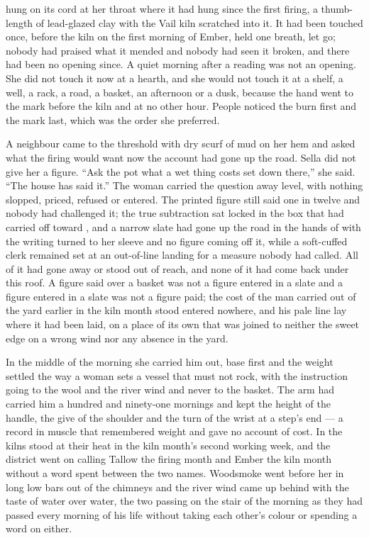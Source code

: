 hung on its cord at her throat where it had hung since the first firing, a thumb-length of lead-glazed clay with the Vail kiln scratched into it. It had been touched once, before the kiln on the first morning of Ember, held one breath, let go; nobody had praised what it mended and nobody had seen it broken, and there had been no opening since. A quiet morning after a reading was not an opening. She did not touch it now at a hearth, and she would not touch it at a shelf, a well, a rack, a road, a basket, an afternoon or a dusk, because the hand went to the mark before the kiln and at no other hour. People noticed the burn first and the mark last, which was the order she preferred.

A neighbour came to the threshold with dry scurf of mud on her hem and asked what the firing would want now the account had gone up the road. Sella did not give her a figure. “Ask the pot what a wet thing costs set down there,” she said. “The house has said it.” The woman carried the question away level, with nothing slopped, priced, refused or entered. The printed figure still said one in twelve and nobody had challenged it; the true subtraction sat locked in the box that  had carried off toward , and a narrow slate had gone up the road in the hands of  with the writing turned to her sleeve and no figure coming off it, while a soft-cuffed clerk remained set at an out-of-line landing for a measure nobody had called. All of it had gone away or stood out of reach, and none of it had come back under this roof. A figure said over a basket was not a figure entered in a slate and a figure entered in a slate was not a figure paid; the cost of the man carried out of the yard earlier in the kiln month stood entered nowhere, and his pale line lay where it had been laid, on a place of its own that was joined to neither the sweet edge on a wrong wind nor any absence in the yard.

\scenebreak

In the middle of the morning she carried him out, base first and the weight settled the way a woman sets a vessel that must not rock, with the instruction going to the wool and the river wind and never to the basket. The arm had carried him a hundred and ninety-one mornings and kept the height of the handle, the give of the shoulder and the turn of the wrist at a step's end --- a record in muscle that remembered weight and gave no account of cost. In  the kilns stood at their heat in the kiln month's second working week, and the district went on calling Tallow the firing month and Ember the kiln month without a word spent between the two names. Woodsmoke went before her in long low bars out of the chimneys and the river wind came up behind with the taste of water over water, the two passing on the stair of the morning as they had passed every morning of his life without taking each other's colour or spending a word on either.

